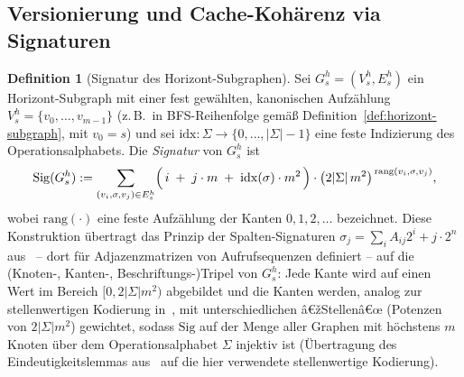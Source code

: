 ﻿\documentclass[a4paper,12pt]{article}
\theoremstyle{definition}
\newtheorem{definition}{Definition}
\begin{document}
\subsection{Versionierung und Cache-Kohärenz via Signaturen}
\label{sec:hst-cache}

\begin{definition}[Signatur des Horizont-Subgraphen]
	\label{def:signatur-horizont}
	Sei $G_s^h=(V_s^h,E_s^h)$ ein Horizont-Subgraph mit einer fest gewählten,
	kanonischen Aufzählung $V_s^h=\{v_0,\ldots,v_{m-1}\}$ (z.\,B.\ in BFS-Reihenfolge
	gemäß Definition~\ref{def:horizont-subgraph}, mit $v_0=s$) und sei
	$\mathrm{idx}:\Sigma\to\{0,\ldots,|\Sigma|-1\}$ eine feste Indizierung des
	Operationsalphabets. Die \emph{Signatur} von $G_s^h$ ist
	\[
		\mathrm{Sig}(G_s^h) := \sum_{(v_i,\sigma,v_j)\in E_s^h}
		\Bigl(\, i \;+\; j\cdot m \;+\; \mathrm{idx}(\sigma)\cdot m^2 \,\Bigr)\cdot
		\bigl(2|\Sigma|\,m^2\bigr)^{\,\mathrm{rang}(v_i,\sigma,v_j)},
	\]
	wobei $\mathrm{rang}(\cdot)$ eine feste Aufzählung der Kanten $0,1,2,\ldots$
	bezeichnet. Diese Konstruktion übertragt das Prinzip der Spalten-Signaturen
	$\sigma_j=\sum_iA_{ij}2^i+j\cdot2^n$ aus~\cite{epp2026subgraph} -- dort für
	Adjazenzmatrizen von Aufrufsequenzen definiert -- auf die (Knoten-, Kanten-,
	Beschriftungs-)Tripel von $G_s^h$: Jede Kante wird auf einen Wert im Bereich
	$[0,2|\Sigma|m^2)$ abgebildet und die Kanten werden, analog zur stellenwertigen
	Kodierung in~\cite{epp2026subgraph}, mit unterschiedlichen â€žStellenâ€œ (Potenzen von
	$2|\Sigma|m^2$) gewichtet, sodass $\mathrm{Sig}$ auf der Menge aller Graphen mit
	höchstens $m$ Knoten über dem Operationsalphabet $\Sigma$ injektiv ist (Übertragung
	des Eindeutigkeitslemmas aus~\cite{epp2026subgraph} auf die hier verwendete
	stellenwertige Kodierung).
\end{definition}
\end{document}
